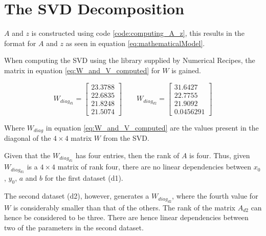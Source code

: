 \section{The SVD Decomposition}

$A$ and $z$ is constructed using code \ref{code:computing_A_z}, this results in the format for $A$ and $z$ as seen in equation \ref{eq:mathematicalModel}.



When computing the SVD using the library supplied by Numerical Recipes, the matrix in equation \ref{eq:W_and_V_computed} for $W$
is gained.

\begin{equation}
W_{diag_{d1}} = 
\left[
\begin{array}{c}
23.3788 \\
22.6835 \\
21.8248 \\
21.5074
\end{array}
\right]
% 
\qquad
% 
W_{diag_{d2}} = 
\left[
\begin{array}{c}
31.6427\\
22.7755\\
21.9092\\
0.0456291
\end{array}
\right]
\label{eq:W_and_V_computed}
\end{equation}

Where $W_{diag}$ in equation \ref{eq:W_and_V_computed} are the values present in the diagonal of the $4 \times 4$ matrix $W$ from the SVD.

Given that the $W_{diag_{d1}}$ has four entries, then the rank of $A$ is four. 
Thus, given $W_{diag_{d1}}$ is a $4 \times 4$ matrix of rank four, there are no linear dependencies between $x_0$, $y_0$, $a$ and $b$ for the first dataset (d1).

The second dataset (d2), however, generates a $W_{diag_{d2}}$, where the fourth value for $W$ is considerably smaller than that of the others.
The rank of the matrix $A_{d2}$ can hence be considered to be three.
There are hence linear dependencies between two of the parameters in the second dataset.


